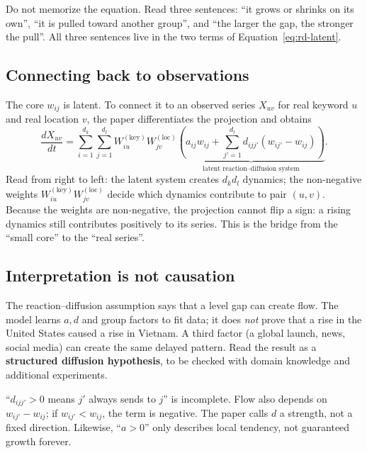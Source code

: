 \begin{plainwords}
Do not memorize the equation. Read three sentences: ``it grows or shrinks on its own'', ``it is
pulled toward another group'', and ``the larger the gap, the stronger the pull''. All three sentences live
in the two terms of Equation~\eqref{eq:rd-latent}.
\end{plainwords}

\subsection{Connecting back to observations}

The core $w_{ij}$ is latent. To connect it to an observed series $X_{uv}$ for real keyword $u$ and
real location $v$, the paper differentiates the projection and obtains
\begin{equation}
  \frac{dX_{uv}}{dt}
  =\sum_{i=1}^{d_k}\sum_{j=1}^{d_l}
   W^{(\mathrm{key})}_{iu}W^{(\mathrm{loc})}_{jv}
   \underbrace{\left(
     a_{ij}w_{ij}+\sum_{j'=1}^{d_l}d_{ijj'}(w_{ij'}-w_{ij})
   \right)}_{\text{latent reaction--diffusion system}}.
  \label{eq:observed-derivative}
\end{equation}
Read from right to left: the latent system creates $d_k d_l$ dynamics; the non-negative weights
$W^{(\mathrm{key})}_{iu}W^{(\mathrm{loc})}_{jv}$ decide which dynamics contribute to pair $(u,v)$.
Because the weights are non-negative, the projection cannot flip a sign: a rising dynamics still
contributes positively to its series. This is the bridge from the ``small core'' to the ``real series''.

\subsection{Interpretation is not causation}

The reaction--diffusion assumption says that a level gap can create flow. The model learns $a,d$ and
group factors to fit data; it does \emph{not} prove that a rise in the United States caused a rise in
Vietnam. A third factor (a global launch, news, social media) can create the same delayed pattern.
Read the result as a \textbf{structured diffusion hypothesis}, to be checked with domain knowledge and
additional experiments.

\begin{commonmistake}
``$d_{ijj'}>0$ means $j'$ always sends to $j$'' is incomplete. Flow also depends on
$w_{ij'}-w_{ij}$; if $w_{ij'}<w_{ij}$, the term is negative. The paper calls $d$ a strength, not a
fixed direction. Likewise, ``$a>0$'' only describes local tendency, not guaranteed growth forever.
\end{commonmistake}

